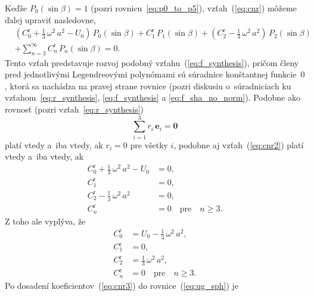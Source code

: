 \documentclass[a4paper, 12pt]{book}
\let\vec\mathbf
\begin{document}
Keďže $P_0(\sin\beta) = 1$ (pozri rovnicu~\ref{eq:p0_to_p5}), 
vzťah~(\ref{eq:cnr}) môžeme ďalej upraviť nasledovne,
%
\begin{equation}
\label{eq:cnr2}
\begin{split}
&\left( C_0^\mathrm{r} + \frac{1}{3} \, \omega^2 \, a^2 - U_0 \right) \, 
P_0(\sin\beta) + C_1^\mathrm{r} \, P_1(\sin\beta) + \left(C_2^\mathrm{r} 
- \frac{1}{3} \, \omega^2 \, a^2 \right) \, P_2(\sin\beta)\\
%
&+ \sum_{n = 3}^\infty C^{\mathrm{r}}_n \, P_n(\sin\beta) = 0{.}
\end{split}
\end{equation}
%
Tento vzťah predstavuje rozvoj podobný vzťahu~(\ref{eq:f_synthesis}), pričom 
členy pred jednotlivými Legendreovými polynómami sú súradnice konštantnej 
funkcie~$0$, ktorá sa nachádza na pravej strane rovnice (pozri diskusiu 
o~súradniciach ku vzťahom~\ref{eq:r_synthesis}, \ref{eq:f_synthesis} 
a \ref{eq:f_sha_no_norm}).  Podobne ako rovnosť (pozri 
vzťah~\ref{eq:r_synthesis})
%
\begin{equation}
\sum_{i = 1}^3 r_i \, \vec{e}_i = \vec{0}
\end{equation}
%
platí vtedy a~iba vtedy, ak $r_i = 0$ pre všetky $i$, podobne aj 
vzťah~(\ref{eq:cnr2}) platí vtedy a~iba vtedy, ak
%
\begin{equation}
\begin{split}
C_0^\mathrm{r} + \frac{1}{3} \, \omega^2 \, a^2 - U_0 &= 0{,}\\
C_1^\mathrm{r}                                        &= 0{,}\\
C_2^\mathrm{r} - \frac{1}{3} \, \omega^2 \, a^2       &= 0{,}\\
C_n^\mathrm{r}                                        &= 0 \quad \textrm{pre} 
\quad n \geq 3{.}
\end{split}
\end{equation}
%
Z toho ale vyplýva, že
%
\begin{equation}
\label{eq:cnr3}
\begin{split}
C_0^\mathrm{r} &= U_0 - \frac{1}{3} \, \omega^2 \, a^2{,}\\
C_1^\mathrm{r} &= 0{,}\\
C_2^\mathrm{r} &= \frac{1}{3} \, \omega^2 \, a^2{,}\\
C_n^\mathrm{r} &= 0 \quad \textrm{pre} \quad n \geq 3{.}
\end{split}
\end{equation}
%
Po dosadení koeficientov~(\ref{eq:cnr3}) do rovnice~(\ref{eq:ug_sph}) je 
\end{document}
